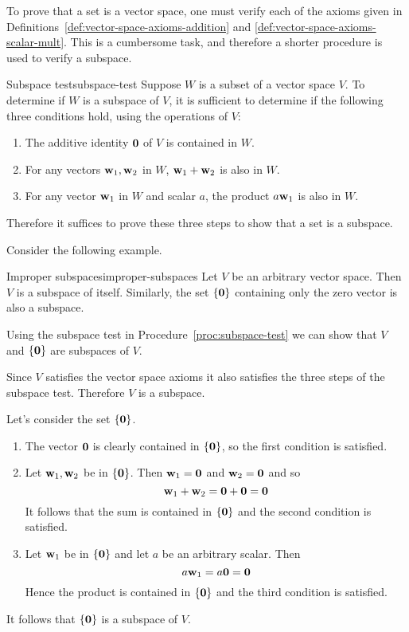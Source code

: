 To prove that a set is a vector space, one must verify each of the axioms given in Definitions~\ref{def:vector-space-axioms-addition} and {\ref{def:vector-space-axioms-scalar-mult}}. This is a cumbersome task, and therefore a shorter procedure is used to verify a subspace.

\begin{procedure}{Subspace test}{subspace-test}
Suppose $W$ is a subset of a vector space $V$. To determine if $W$ is a subspace of $V$, it is sufficient to determine if the following three conditions hold, using the operations of $V$:
\begin{enumerate}
\item
The additive identity $\mbox{\bf 0}$ of $V$ is contained in $W$.
\item
For any vectors $\mbox{\bf w}_1, \mbox{\bf w}_2$ in $W$, $\mbox{\bf w}_1 + \mbox{\bf w}_2$ is also in $W$.
\item
For any vector $\mbox{\bf w}_1$ in $W$ and scalar $a$,  the product $a\mbox{\bf w}_1$ is also in $W$.
\end{enumerate}
\end{procedure}

Therefore it suffices to prove these three steps to show that a set is a subspace.

Consider the following example.

\begin{example}{Improper subspaces}{improper-subspaces}
Let $V$ be an arbitrary vector space. Then $V$ is a subspace of itself. Similarly, the set $\left\{\mbox{\bf 0} \right\}$ containing only the zero vector is also a subspace.
\end{example}

\begin{solution}
Using the subspace test in Procedure~\ref{proc:subspace-test} we can show that $V$ and $\left\{\mbox{\bf 0} \right\}$ are subspaces of $V$.

Since $V$ satisfies the vector space axioms it also satisfies the three steps of the subspace test. Therefore $V$ is a subspace.

Let's consider the set $\left\{\mbox{\bf 0} \right\}$.
\begin{enumerate}
\item
The vector $\mbox{\bf 0}$ is clearly contained in  $\left\{\mbox{\bf 0} \right\}$, so the first condition is satisfied.

\item
Let $\mbox{\bf w}_1, \mbox{\bf w}_2$ be in  $\left\{\mbox{\bf 0} \right\}$. Then $\mbox{\bf w}_1 = \mbox{\bf 0}$ and $\mbox{\bf w}_2 = \mbox{\bf 0}$ and so
\[
\mbox{\bf w}_1 + \mbox{\bf w}_2 = \mbox{\bf 0} + \mbox{\bf 0} = \mbox{\bf 0}
\]
It follows that the sum is contained in $\left\{\mbox{\bf 0} \right\}$ and the second condition is satisfied.

\item
Let $\mbox{\bf w}_1$ be in  $\left\{\mbox{\bf 0} \right\}$ and let $a$ be an arbitrary scalar. Then
\[
a\mbox{\bf w}_1  = a\mbox{\bf 0} = \mbox{\bf 0}
\]
Hence the product is contained in  $\left\{\mbox{\bf 0} \right\}$ and the third condition is satisfied.
\end{enumerate}

It follows that  $\left\{\mbox{\bf 0} \right\}$ is a subspace of $V$.
\end{solution}

